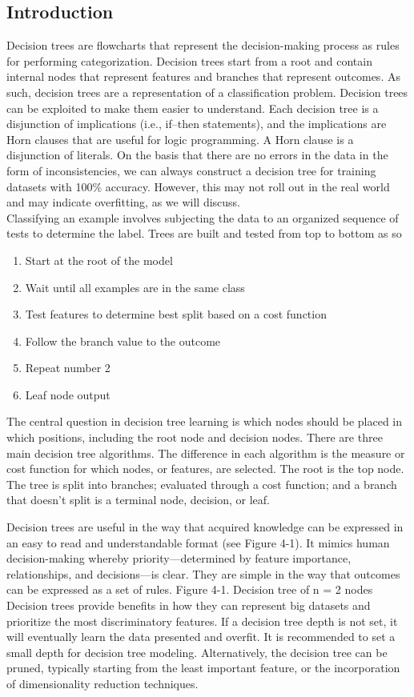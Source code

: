 \documentclass[12pt]{article}
\begin{document}
\subsection{Introduction}
Decision trees are flowcharts that represent the decision-making process
as rules for performing categorization. Decision trees start from a root and
contain internal nodes that represent features and branches that represent
outcomes. As such, decision trees are a representation of a classification
problem. Decision trees can be exploited to make them easier to
understand. Each decision tree is a disjunction of implications (i.e., if–then
statements), and the implications are Horn clauses that are useful for logic
programming. A Horn clause is a disjunction of literals.
On the basis that there are no errors in the data in the form of
inconsistencies, we can always construct a decision tree for training
datasets with 100\% accuracy. However, this may not roll out in the real
world and may indicate overfitting, as we will discuss.
\\
Classifying an example involves subjecting the data to an organized
sequence of tests to determine the label. Trees are built and tested from
top to bottom as so
\begin{enumerate}
\item Start at the root of the model
\item Wait until all examples are in the same class
\item Test features to determine best split based on a cost function
\item Follow the branch value to the outcome
\item Repeat number 2
\item Leaf node output
\end{enumerate}

The central question in decision tree learning is which nodes should
be placed in which positions, including the root node and decision nodes.
There are three main decision tree algorithms. The difference in each
algorithm is the measure or cost function for which nodes, or features, are
selected. The root is the top node. The tree is split into branches; evaluated
through a cost function; and a branch that doesn’t split is a terminal node,
decision, or leaf.


Decision trees are useful in the way that acquired knowledge can be
expressed in an easy to read and understandable format (see Figure 4-1).
It mimics human decision-making whereby priority—determined by
feature importance, relationships, and decisions—is clear. They are simple
in the way that outcomes can be expressed as a set of rules.
Figure 4-1. Decision tree of n = 2 nodes
Decision trees provide benefits in how they can represent big
datasets and prioritize the most discriminatory features. If a decision tree
depth is not set, it will eventually learn the data presented and overfit.
It is recommended to set a small depth for decision tree modeling.
Alternatively, the decision tree can be pruned, typically starting from the
least important feature, or the incorporation of dimensionality reduction
techniques.
\end{document}
